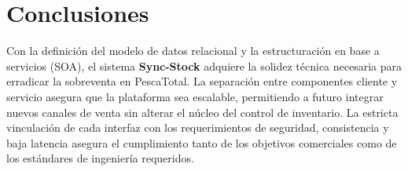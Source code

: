 \documentclass[12pt,a4paper]{article}
\begin{document}
\section{Conclusiones}
Con la definición del modelo de datos relacional y la estructuración en base a servicios (SOA), el sistema \textbf{Sync-Stock} adquiere la solidez técnica necesaria para erradicar la sobreventa en PescaTotal. La separación entre componentes cliente y servicio asegura que la plataforma sea escalable, permitiendo a futuro integrar nuevos canales de venta sin alterar el núcleo del control de inventario. La estricta vinculación de cada interfaz con los requerimientos de seguridad, consistencia y baja latencia asegura el cumplimiento tanto de los objetivos comerciales como de los estándares de ingeniería requeridos.
\end{document}
